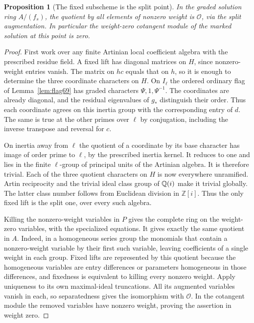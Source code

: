 \documentclass[a4paper,11pt]{article}
\newtheorem{proposition}{Proposition}[section]
\theoremstyle{definition}
\theoremstyle{remark}
\newcommand{\ZZ}{\mathbb Z}\newcommand{\ord}{\operatorname{ord}}
\numberwithin{equation}{section}
\newcommand{\OO}{\mathcal O}
\begin{document}
\begin{proposition}[The fixed subscheme is the split point]
\label{prop:fixed116}
In the graded solution ring \(A/(f_s)\), the quotient by all
elements of nonzero weight is \(\OO\), via the split augmentation.
In particular the weight-zero cotangent module of the marked
solution at this point is zero.
\end{proposition}
\begin{proof}
First work over any finite Artinian local coefficient algebra
with the prescribed residue field. A fixed lift has diagonal
matrices on \(H\), since nonzero-weight entries vanish. The
matrix on \(hc\) equals that on \(h\), so it is enough to
determine the three coordinate characters on \(H\).
On \(I_\ell\) the ordered ordinary flag of Lemma~\ref{lem:flag69}
has graded characters \(\Psi,1,\Psi^{-1}\). The coordinates
are already diagonal, and the residual eigenvalues of \(g_*\)
distinguish their order. Thus each coordinate agrees on this
inertia group with the corresponding entry of \(d\). The same
is true at the other primes over \(\ell\) by conjugation,
including the inverse transpose and reversal for \(c\).

On inertia away from \(\ell\) the quotient of a coordinate by
its base character has image of order prime to \(\ell\), by the
prescribed inertia kernel. It reduces to one and lies in the
finite \(\ell\)-group of principal units of the Artinian algebra.
It is therefore trivial. Each of the three quotient characters
on \(H\) is now everywhere unramified. Artin reciprocity and
the trivial ideal class group of \(\mathbb Q(i)\) make it trivial
globally. The latter class number follows from Euclidean division
in \(\ZZ[i]\). Thus the only fixed lift is the split one, over
every such algebra.

Killing the nonzero-weight variables in \(P\) gives the complete
ring on the weight-zero variables, with the specialized equations.
It gives exactly the same quotient in \(A\). Indeed, in a
homogeneous series group the monomials that contain a nonzero-weight
variable by their first such variable, leaving coefficients of a
single weight in each group. Fixed lifts are represented by this
quotient because the homogeneous variables are entry differences or
parameters homogeneous in those differences, and fixedness is
equivalent to killing every nonzero weight. Apply uniqueness to
its own maximal-ideal truncations. All its augmented variables
vanish in each, so separatedness gives the isomorphism with
\(\OO\). In the cotangent module the removed variables have
nonzero weight, proving the assertion in weight zero.
\end{proof}
\end{document}
